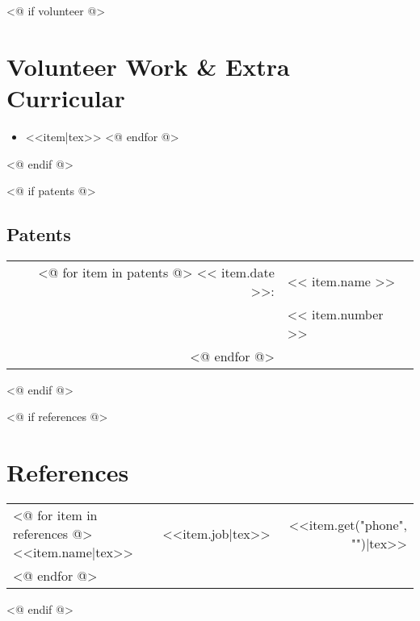 \documentclass[letter,11pt]{article}
\begin{document}

<@ if volunteer @>
\section*{Volunteer Work \& Extra Curricular}

\begin{samepage}
\begin{itemize}[leftmargin=1.5em]
    \setlength{\itemsep}{0pt}
    \setlength{\parskip}{0pt}
    \setlength{\parsep}{0pt}
<@ for item in volunteer @>
    \item <<item|tex>>
<@ endfor @>
\end{itemize}
\end{samepage}
<@ endif @>


<@ if patents @>
\begin{samepage}
\section*{Patents}

\begin{tabular}{rl}
<@ for item in  patents @>
    << item.date >>: & << item.name >> \\
                & << item.number >> \\
<@ endfor @>
\end{tabular}
\end{samepage}
<@ endif @>


<@ if references @>
\newpage

\section*{References}
\begin{tabularx}{0.75\textwidth}{lCr}
<@ for item in references @>
    <<item.name|tex>> & <<item.job|tex>> & <<item.get("phone", "")|tex>>\\
<@ endfor @>
\end{tabularx}

<@ endif @>

\end{document}
